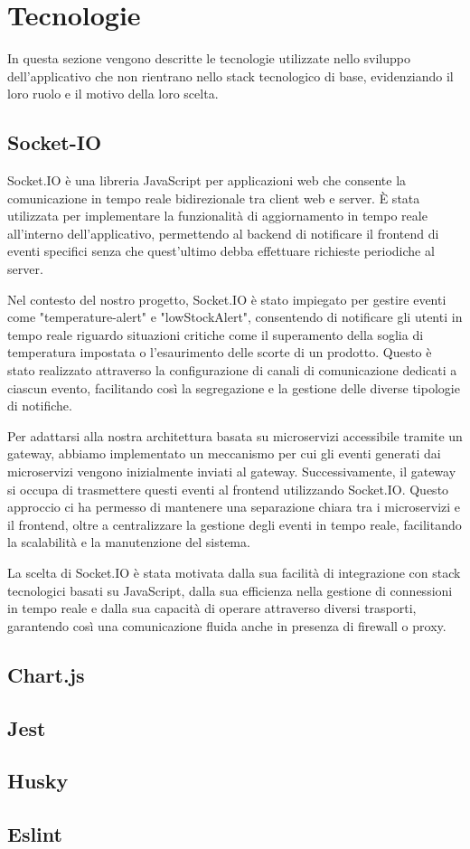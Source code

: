 \section{Tecnologie}

In questa sezione vengono descritte le tecnologie utilizzate nello sviluppo dell'applicativo che non rientrano nello stack tecnologico di base, evidenziando il loro ruolo e il motivo della loro scelta.

\subsection{Socket-IO}
Socket.IO è una libreria JavaScript per applicazioni web che consente la comunicazione in tempo reale bidirezionale tra client web e server. È stata utilizzata per implementare la funzionalità di aggiornamento in tempo reale all'interno dell'applicativo, permettendo al backend di notificare il frontend di eventi specifici senza che quest'ultimo debba effettuare richieste periodiche al server.

Nel contesto del nostro progetto, Socket.IO è stato impiegato per gestire eventi come "temperature-alert" e "lowStockAlert", consentendo di notificare gli utenti in tempo reale riguardo situazioni critiche come il superamento della soglia di temperatura impostata o l'esaurimento delle scorte di un prodotto. Questo è stato realizzato attraverso la configurazione di canali di comunicazione dedicati a ciascun evento, facilitando così la segregazione e la gestione delle diverse tipologie di notifiche.

Per adattarsi alla nostra architettura basata su microservizi accessibile tramite un gateway, abbiamo implementato un meccanismo per cui gli eventi generati dai microservizi vengono inizialmente inviati al gateway. Successivamente, il gateway si occupa di trasmettere questi eventi al frontend utilizzando Socket.IO. Questo approccio ci ha permesso di mantenere una separazione chiara tra i microservizi e il frontend, oltre a centralizzare la gestione degli eventi in tempo reale, facilitando la scalabilità e la manutenzione del sistema.

La scelta di Socket.IO è stata motivata dalla sua facilità di integrazione con stack tecnologici basati su JavaScript, dalla sua efficienza nella gestione di connessioni in tempo reale e dalla sua capacità di operare attraverso diversi trasporti, garantendo così una comunicazione fluida anche in presenza di firewall o proxy.

\subsection{Chart.js}
\subsection{Jest}
\subsection{Husky}
\subsection{Eslint}